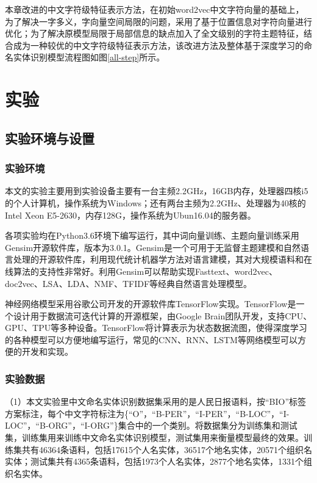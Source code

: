 \documentclass[winfonts,master,oneside,nobackinfo]{njuthesis}
\begin{document}
本章改进的中文字符级特征表示方法，在初始word2vec中文字符向量的基础上，为了解决一字多义，字向量空间局限的问题，采用了基于位置信息对字符向量进行优化；为了解决原模型局限于局部信息的缺点加入了全文级别的字符主题特征，结合成为一种较优的中文字符级特征表示方法，该改进方法及整体基于深度学习的命名实体识别模型流程图如图\ref{all-step}所示。



\section{实验}

\subsection{实验环境与设置}

\subsubsection{实验环境}

本文的实验主要用到实验设备主要有一台主频2.2GHz，16GB内存，处理器四核i5的个人计算机，操作系统为Windows；还有两台主频为2.2GHz、处理器为40核的Intel Xeon E5-2630，内存128G，操作系统为Ubun16.04的服务器。

各项实验均在Python3.6环境下编写运行，其中词向量训练、主题向量训练采用Gensim开源软件库，版本为3.0.1。Gensim是一个可用于无监督主题建模和自然语言处理的开源软件库，利用现代统计机器学方法对语言建模，其对大规模语料和在线算法的支持性非常好。利用Gensim可以帮助实现Fasttext、word2vec、doc2vec、LSA、LDA、NMF、TFIDF等经典自然语言处理模型。

神经网络模型采用谷歌公司开发的开源软件库TensorFlow\cite{TensorFlow}实现。TensorFlow是一个设计用于数据流可迭代计算的开源框架，由Google Brain团队开发，支持CPU、GPU、TPU等多种设备。TensorFlow将计算表示为状态数据流图，使得深度学习的各种模型可以方便地编写运行，常见的CNN、RNN、LSTM等网络模型可以方便的开发和实现。

\subsubsection{实验数据}

（1）本文实验里中文命名实体识别数据集采用的是人民日报语料，按“BIO”标签方案标注，每个中文字符标注为\{“O”，“B-PER”，“I-PER”，“B-LOC”，“I-LOC”，“B-ORG”，“I-ORG”\}集合中的一个类别。将数据集分为训练集和测试集，训练集用来训练中文命名实体识别模型，测试集用来衡量模型最终的效果。训练集共有46364条语料，包括17615个人名实体，36517个地名实体，20571个组织名实体；测试集共有4365条语料，包括1973个人名实体，2877个地名实体，1331个组织名实体。
\end{document}
